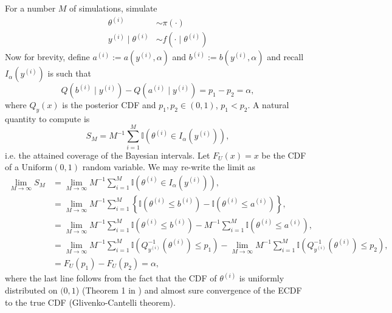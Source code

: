 \documentclass[oneside]{article}
\begin{document}
For a number $M$ of simulations, simulate
$$
\begin{align}
\theta^{(i)} &\sim \pi(\cdot) \\
y^{(i)} \mid \theta^{(i)} &\sim f(\cdot \mid \theta^{(i)})
\end{align}
$$
Now  for brevity, define $a^{(i)} := a(y^{(i)}, \alpha)$ and $b^{(i)} := b(y^{(i)}, \alpha)$ and recall $I_{\alpha}\left(y^{(i)}\right)$ is such that 
$$
Q\left(b^{(i)} \mid y^{(i)}\right) - Q\left(a^{(i)} \mid y^{(i)}\right) = p_1 - p_2 = \alpha,
$$
where $Q_{y}(x)$ is the posterior CDF and $p_1, p_2 \in (0,1)$, $p_1 < p_2$.
A natural quantity to compute is
$$
S_M = M^{-1}\sum_{i=1}^M \mathbb{I}\left(\theta^{(i)} \in I_{\alpha}\left(y^{(i)}\right) \right),
$$
i.e. the attained coverage of the Bayesian intervals.
Let $F_U(x) = x$ be the CDF of a $\operatorname{Uniform(0, 1)}$ random variable. 
We may re-write the limit as
$$
\begin{align}
\lim_{M \to \infty} S_M &= \lim_{M \to \infty} M^{-1}\sum_{i=1}^M \mathbb{I}\left(\theta^{(i)} \in I_{\alpha}\left(y^{(i)}\right) \right),\\
&=  \lim_{M \to \infty} M^{-1}\sum_{i=1}^M \left\{ \mathbb{I}\left(\theta^{(i)} \leq b^{(i)} \right) - \mathbb{I}\left(\theta^{(i)} \leq a^{(i)} \right) \right\},\\
&=  \lim_{M \to \infty} M^{-1}\sum_{i=1}^M \mathbb{I}\left(\theta^{(i)} \leq b^{(i)} \right) -  M^{-1}\sum_{i=1}^M\mathbb{I}\left(\theta^{(i)} \leq a^{(i)} \right),\\
&=  \lim_{M \to \infty} M^{-1}\sum_{i=1}^M \mathbb{I}\left(Q_{y^{(i)}}^{-1}\left(\theta^{(i)}\right) \leq p_1 \right) -   \lim_{M \to \infty} M^{-1}\sum_{i=1}^M\mathbb{I}\left(Q_{y^{(i)}}^{-1}\left(\theta^{(i)}\right) \leq p_2 \right),\\
&= F_U(p_1) - F_U(p_2) = \alpha,
\end{align}
$$
where the last line follows from the fact that the CDF of $\theta^{(i)}$ is uniformly distributed on $(0, 1$) (Theorem 1 in \cite{Cook2006}) and almost sure convergence of the ECDF to the true CDF (Glivenko-Cantelli theorem).
\end{document}

